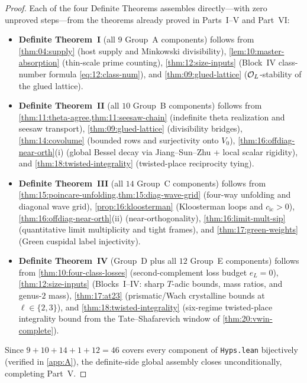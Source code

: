 \begin{proof}
Each of the four Definite Theorems assembles directly—with zero unproved steps—from the theorems already proved in Parts~I--V and Part~VI:
\begin{itemize}
\item \textbf{Definite Theorem~I} (all $9$ Group~A components) follows from \cref{thm:04:supply} (host supply and Minkowski divisibility), \cref{lem:10:master-absorption} (thin-scale prime counting), \cref{thm:12:size-inputs} (Block~IV class-number formula \eqref{eq:12:class-num}), and \cref{thm:09:glued-lattice} ($\mathcal{O}_L$-stability of the glued lattice).
\item \textbf{Definite Theorem~II} (all $10$ Group~B components) follows from \cref{thm:11:theta-agree,thm:11:seesaw-chain} (indefinite theta realization and seesaw transport), \cref{thm:09:glued-lattice} (divisibility bridges), \cref{thm:14:covolume} (bounded rows and surjectivity onto $V_0$), \cref{thm:16:offdiag-near-orth}(i) (global Bessel decay via Jiang--Sun--Zhu + local scalar rigidity), and \cref{thm:18:twisted-integrality} (twisted-place reciprocity tying).
\item \textbf{Definite Theorem~III} (all $14$ Group~C components) follows from \cref{thm:15:poincare-unfolding,thm:15:diag-wave-grid} (four-way unfolding and diagonal wave grid), \cref{prop:16:kloosterman} (Kloosterman loops and $c_{\mathrm{ic}} > 0$), \cref{thm:16:offdiag-near-orth}(ii) (near-orthogonality), \cref{thm:16:limit-mult-sip} (quantitative limit multiplicity and tight frames), and \cref{thm:17:green-weights} (Green cuspidal label injectivity).
\item \textbf{Definite Theorem~IV} (Group~D plus all $12$ Group~E components) follows from \cref{thm:10:four-class-losses} (second-complement loss budget $e_L = 0$), \cref{thm:12:size-inputs} (Blocks~I--IV: sharp $T$-adic bounds, mass ratios, and genus-$2$ mass), \cref{thm:17:at23} (prismatic/Wach crystalline bounds at $\ell \in \{2, 3\}$), and \cref{thm:18:twisted-integrality} (six-regime twisted-place integrality bound from the Tate--Shafarevich window of \cref{thm:20:vwin-complete}).
\end{itemize}
Since $9 + 10 + 14 + 1 + 12 = 46$ covers every component of \texttt{Hyps.lean} bijectively (verified in \cref{app:A}), the definite-side global assembly closes unconditionally, completing Part~V.
\end{proof}
